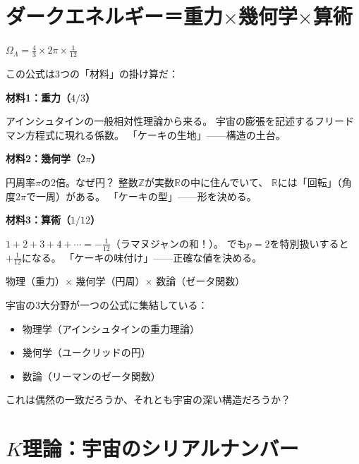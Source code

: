 \documentclass[12pt,a4paper]{article}
\begin{document}
\section{ダークエネルギー＝重力$\times$幾何学$\times$算術}

\begin{analogybox}
$\Omega_\Lambda = \frac{4}{3} \times 2\pi \times \frac{1}{12}$

この公式は3つの「材料」の掛け算だ：

\textbf{材料1：重力（$4/3$）}

アインシュタインの一般相対性理論から来る。
宇宙の膨張を記述するフリードマン方程式に現れる係数。
「ケーキの生地」——構造の土台。

\textbf{材料2：幾何学（$2\pi$）}

円周率$\pi$の2倍。なぜ円？
整数$\mathbb{Z}$が実数$\mathbb{R}$の中に住んでいて、
$\mathbb{R}$には「回転」（角度$2\pi$で一周）がある。
「ケーキの型」——形を決める。

\textbf{材料3：算術（$1/12$）}

$1+2+3+4+\cdots = -\frac{1}{12}$（ラマヌジャンの和！）。
でも$p=2$を特別扱いすると$+\frac{1}{12}$になる。
「ケーキの味付け」——正確な値を決める。
\end{analogybox}

\begin{mathbox}[なぜこの分解が重要なのか]
物理（重力）$\times$ 幾何学（円周）$\times$ 数論（ゼータ関数）

宇宙の3大分野が一つの公式に集結している：
\begin{itemize}
\item 物理学（アインシュタインの重力理論）
\item 幾何学（ユークリッドの円）
\item 数論（リーマンのゼータ関数）
\end{itemize}

これは偶然の一致だろうか、それとも宇宙の深い構造だろうか？
\end{mathbox}

\section{$K$理論：宇宙のシリアルナンバー}
\end{document}
